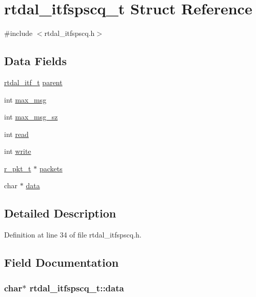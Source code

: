 \hypertarget{structrtdal__itfspscq__t}{\section{rtdal\-\_\-itfspscq\-\_\-t Struct Reference}
\label{structrtdal__itfspscq__t}
}


{\ttfamily \#include $<$rtdal\-\_\-itfspscq.\-h$>$}

\subsection*{Data Fields}
\begin{DoxyCompactItemize}
\item 
\hyperlink{structrtdal__itf__t}{rtdal\-\_\-itf\-\_\-t} \hyperlink{structrtdal__itfspscq__t_aed92982a615adbe1ae3d1e149faf382f}{parent}
\item 
int \hyperlink{structrtdal__itfspscq__t_a9a7ca95050337e31cf161653e77501de}{max\-\_\-msg}
\item 
int \hyperlink{structrtdal__itfspscq__t_a7b1b411ad0e83163ef0a2a2352a7ad1d}{max\-\_\-msg\-\_\-sz}
\item 
int \hyperlink{structrtdal__itfspscq__t_a8c184b2163d17ecbe3ebb4190314e427}{read}
\item 
int \hyperlink{structrtdal__itfspscq__t_a41d853b973164484c80ee9125e4178d1}{write}
\item 
\hyperlink{structr__pkt__t}{r\-\_\-pkt\-\_\-t} $\ast$ \hyperlink{structrtdal__itfspscq__t_a08b1f24f2968b598c462a112a9bfd824}{packets}
\item 
char $\ast$ \hyperlink{structrtdal__itfspscq__t_adc75f06ba07f4848a744a2ffb10ddb0e}{data}
\end{DoxyCompactItemize}


\subsection{Detailed Description}


Definition at line 34 of file rtdal\-\_\-itfspscq.\-h.



\subsection{Field Documentation}
\hypertarget{structrtdal__itfspscq__t_adc75f06ba07f4848a744a2ffb10ddb0e}{
\subsubsection[{data}]{\setlength{\rightskip}{0pt plus 5cm}char$\ast$ rtdal\-\_\-itfspscq\-\_\-t\-::data}}\label{structrtdal__itfspscq__t_adc75f06ba07f4848a744a2ffb10ddb0e}


